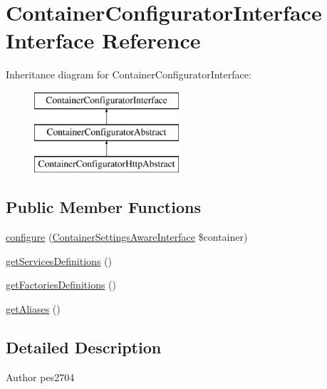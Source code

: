 \hypertarget{interface_pes_1_1_container_1_1_container_configurator_interface}{}\section{Container\+Configurator\+Interface Interface Reference}
\label{interface_pes_1_1_container_1_1_container_configurator_interface}
Inheritance diagram for Container\+Configurator\+Interface\+:\begin{figure}[H]
\begin{center}
\leavevmode
\includegraphics[height=3.000000cm]{interface_pes_1_1_container_1_1_container_configurator_interface}
\end{center}
\end{figure}
\subsection*{Public Member Functions}
\begin{DoxyCompactItemize}
\item 
\mbox{\hyperlink{interface_pes_1_1_container_1_1_container_configurator_interface_aa010017c090252363602d277501f61f4}{configure}} (\mbox{\hyperlink{interface_pes_1_1_container_1_1_container_settings_aware_interface}{Container\+Settings\+Aware\+Interface}} \$container)
\item 
\mbox{\hyperlink{interface_pes_1_1_container_1_1_container_configurator_interface_ab659d0f399e0df92aac860b4927fc0d5}{get\+Services\+Definitions}} ()
\item 
\mbox{\hyperlink{interface_pes_1_1_container_1_1_container_configurator_interface_afdc890d9a68d9d00590f47908f09ae45}{get\+Factories\+Definitions}} ()
\item 
\mbox{\hyperlink{interface_pes_1_1_container_1_1_container_configurator_interface_a1e9e143d493aedb855d3c5edadb17bb2}{get\+Aliases}} ()
\end{DoxyCompactItemize}


\subsection{Detailed Description}
\begin{DoxyAuthor}{Author}
pes2704 
\end{DoxyAuthor}


